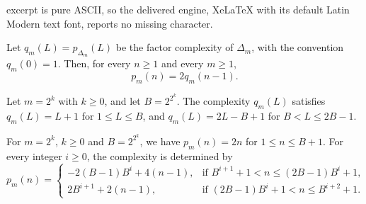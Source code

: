 \documentclass[10pt,a4paper]{amsart}
\begin{document}
excerpt is pure ASCII, so the delivered engine, XeLaTeX with its default Latin Modern text font, reports no missing character.
\begin{lemma}
\label{lem:complexity-derivative-general}
Let $q_m(L) = p_{\Delta_m}(L)$ be the factor complexity of $\Delta_m$, with the convention $q_m(0)=1$. Then, for every $n \ge 1$ and every $m \ge 1$,
\[
        p_m(n) = 2q_m(n-1).
\]
\end{lemma}

\begin{proposition}
\label{prop:delta-initial-complexity}
Let $m = 2^k$ with $k \ge 0$, and let $B = 2^{2^k}$. The complexity $q_m(L)$ satisfies $q_m(L) = L + 1$ for $1 \le L \le B$, and $q_m(L) = 2L - B + 1$ for $B < L \le 2B - 1$.
\end{proposition}

\begin{corollary}
\label{cor:primary-closed-complexity}
For $m=2^k$, $k\ge 0$ and $B=2^{2^k}$, we have $p_m(n)=2n$ for $1\le n\le B+1$. For every integer $i\ge 0$, the complexity is determined by
\[
  p_m(n)=
  \begin{cases}
    -2(B-1)B^i+4(n-1),
       & \text{if } B^{i+1}+1<n\le (2B-1)B^i+1,\\[2mm]
    2B^{i+1}+2(n-1),
       & \text{if } (2B-1)B^i+1<n\le B^{i+2}+1.
  \end{cases}
\]
\end{corollary}
\end{document}
